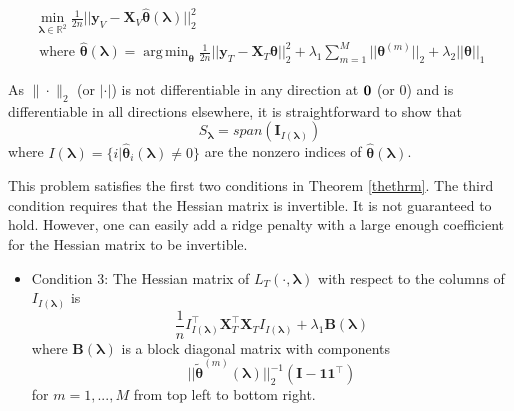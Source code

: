 \documentclass[10pt,letterpaper]{article}
\DeclareMathOperator*{\argmin}{arg\,min}
\begin{document}
\begin{equation}
\begin{array}{c}
\min_{\boldsymbol{\lambda} \in \mathbb{R}^2} \frac{1}{2n} \bigl\lvert\bigl\lvert \boldsymbol{y}_V - \boldsymbol{X}_V \hat{\boldsymbol{\theta}}(\boldsymbol{\lambda}) \bigl\rvert\bigl\rvert^2_2 \\
\text{ where }
\hat{\boldsymbol{\theta}}(\boldsymbol{\lambda}) = \argmin_{\boldsymbol{\theta}} \frac{1}{2n} \bigl\lvert\bigl\lvert \boldsymbol{y}_T - \boldsymbol{X}_T \boldsymbol{\theta} \bigl\rvert\bigl\rvert^2_2
+ \lambda_1 \sum_{m=1}^M \lvert\lvert \boldsymbol\theta^{(m)} \rvert \rvert_2
+ \lambda_2 \lvert\lvert \boldsymbol\theta \rvert \rvert_1
\end{array}
\end{equation}

As $\|\cdot\|_2$ (or $|\cdot|$) is not differentiable in any direction at ${\bf 0}$ (or $0$) and is differentiable in all directions elsewhere, it is straightforward to show that 
\begin{equation}
S_{\boldsymbol \lambda} = span(\boldsymbol I_{I(\boldsymbol\lambda)})
\end{equation}
where $I(\boldsymbol\lambda) = \{i | \hat{\boldsymbol{\theta}}_i(\boldsymbol\lambda) \ne 0\}$ are the nonzero indices of $\hat{\boldsymbol{\theta}}(\boldsymbol{\lambda})$. 

This problem satisfies the first two conditions in Theorem \ref{thethrm}. The third condition requires that the Hessian matrix is invertible. It is not guaranteed to hold. However, one can easily add a ridge penalty with a large enough coefficient for the Hessian matrix to be invertible.

\begin{itemize}
\item[] Condition 3: The Hessian matrix of $L_T(\cdot, \boldsymbol{\lambda})$ with respect to the columns of $I_{I(\boldsymbol \lambda)}$ is
\begin{equation}
\frac{1}{n} I_{I(\boldsymbol \lambda)}^\top \boldsymbol{X}_{T}^\top \boldsymbol{X}_{T} I_{I(\boldsymbol \lambda)}
+ \lambda_1 \boldsymbol{B}(\boldsymbol\lambda)
\end{equation}
where $\boldsymbol{B}(\boldsymbol\lambda)$ is a block diagonal matrix with components 
\begin{equation}
|| \tilde{\boldsymbol{\theta}}^{(m)}(\boldsymbol{\lambda})||_2^{-1} (\boldsymbol{I} - \boldsymbol{1} \boldsymbol{1}^\top)
\end{equation}
for $m=1,...,M$ from top left to bottom right.
\end{itemize}
\end{document}
